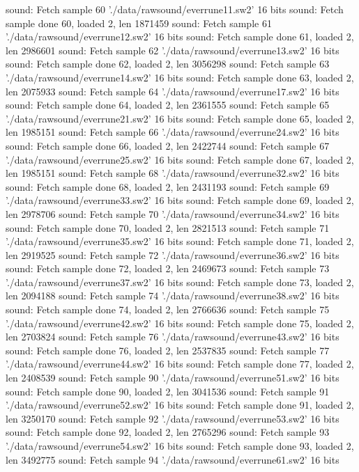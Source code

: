 sound: Fetch sample 60 './data/rawsound/everrune11.sw2' 16 bits
sound:  Fetch sample done 60, loaded 2, len 1871459
sound: Fetch sample 61 './data/rawsound/everrune12.sw2' 16 bits
sound:  Fetch sample done 61, loaded 2, len 2986601
sound: Fetch sample 62 './data/rawsound/everrune13.sw2' 16 bits
sound:  Fetch sample done 62, loaded 2, len 3056298
sound: Fetch sample 63 './data/rawsound/everrune14.sw2' 16 bits
sound:  Fetch sample done 63, loaded 2, len 2075933
sound: Fetch sample 64 './data/rawsound/everrune17.sw2' 16 bits
sound:  Fetch sample done 64, loaded 2, len 2361555
sound: Fetch sample 65 './data/rawsound/everrune21.sw2' 16 bits
sound:  Fetch sample done 65, loaded 2, len 1985151
sound: Fetch sample 66 './data/rawsound/everrune24.sw2' 16 bits
sound:  Fetch sample done 66, loaded 2, len 2422744
sound: Fetch sample 67 './data/rawsound/everrune25.sw2' 16 bits
sound:  Fetch sample done 67, loaded 2, len 1985151
sound: Fetch sample 68 './data/rawsound/everrune32.sw2' 16 bits
sound:  Fetch sample done 68, loaded 2, len 2431193
sound: Fetch sample 69 './data/rawsound/everrune33.sw2' 16 bits
sound:  Fetch sample done 69, loaded 2, len 2978706
sound: Fetch sample 70 './data/rawsound/everrune34.sw2' 16 bits
sound:  Fetch sample done 70, loaded 2, len 2821513
sound: Fetch sample 71 './data/rawsound/everrune35.sw2' 16 bits
sound:  Fetch sample done 71, loaded 2, len 2919525
sound: Fetch sample 72 './data/rawsound/everrune36.sw2' 16 bits
sound:  Fetch sample done 72, loaded 2, len 2469673
sound: Fetch sample 73 './data/rawsound/everrune37.sw2' 16 bits
sound:  Fetch sample done 73, loaded 2, len 2094188
sound: Fetch sample 74 './data/rawsound/everrune38.sw2' 16 bits
sound:  Fetch sample done 74, loaded 2, len 2766636
sound: Fetch sample 75 './data/rawsound/everrune42.sw2' 16 bits
sound:  Fetch sample done 75, loaded 2, len 2703824
sound: Fetch sample 76 './data/rawsound/everrune43.sw2' 16 bits
sound:  Fetch sample done 76, loaded 2, len 2537835
sound: Fetch sample 77 './data/rawsound/everrune44.sw2' 16 bits
sound:  Fetch sample done 77, loaded 2, len 2408539
sound: Fetch sample 90 './data/rawsound/everrune51.sw2' 16 bits
sound:  Fetch sample done 90, loaded 2, len 3041536
sound: Fetch sample 91 './data/rawsound/everrune52.sw2' 16 bits
sound:  Fetch sample done 91, loaded 2, len 3250170
sound: Fetch sample 92 './data/rawsound/everrune53.sw2' 16 bits
sound:  Fetch sample done 92, loaded 2, len 2765296
sound: Fetch sample 93 './data/rawsound/everrune54.sw2' 16 bits
sound:  Fetch sample done 93, loaded 2, len 3492775
sound: Fetch sample 94 './data/rawsound/everrune61.sw2' 16 bits
